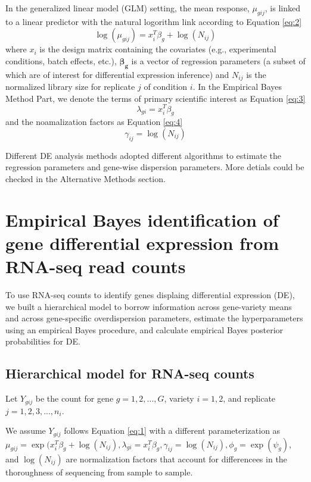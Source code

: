 In the generalized linear model (GLM) setting, the mean response, $\mu_{gij}$, is linked to a  linear predictor with the natural logorithm link according to Equation \eqref{eq:2}
\begin{equation}
\label{eq:2}
\log(\mu_{gij}) = x_{i}^T\beta_g + \log(N_{ij})
\end{equation}
where $x_{i}$ is the design matrix containing the covariates (e.g., experimental conditions, batch effects, etc.), $\mathbf{\beta_g}$ is a vector of regression parameters (a subset of which are of interest for differential expression inference) and $N_{ij}$ is the normalized library size for replicate $j$ of condition $i$. In the Empirical Bayes Method Part, we denote the terms of primary scientific interest as Equation \eqref{eq:3}
\begin{equation}
\label{eq:3}
\lambda_{gi} = x_i ^T \beta_g
\end{equation}
and the noamalization factors as Equation \eqref{eq:4}
\begin{equation}
\label{eq:4}
\gamma_{ij} = \log(N_{ij})
\end{equation}

Different DE analysis methods adopted different algorithms to estimate the regression parameters and gene-wise dispersion parameters. More detials could be checked in the Alternative Methods section. 


\section{Empirical Bayes identification of gene differential expression from RNA-seq read counts}


To use RNA-seq counts to identify genes displaing differential expression (DE), we built a hierarchical model to borrow information across gene-variety means and across gene-specific overdispersion parameters, estimate the hyperparameters using an empirical Bayes procedure, and calculate empirical Bayes posterior probabilities for DE. 

\subsection{Hierarchical model for RNA-seq counts}

Let $Y_{gij}$ be the count for gene $g=1,2,..., G$, variety $i=1,2$, and replicate $j=1,2,3,...,n_i$.

We assume $Y_{gij}$ follows Equation \eqref{eq:1} with a different parameterization as $\mu_{gij} = \exp(x_i^T \beta_g + \log(N_{ij}),\lambda_{gi} = x_i^T \beta_g, \gamma_{ij} =\log(N_{ij}), \phi_g = \exp(\psi_g)$, and $\log(N_{ij})$ are normalization factors that account for differencees in the thoroughness of sequencing from sample to sample. 

